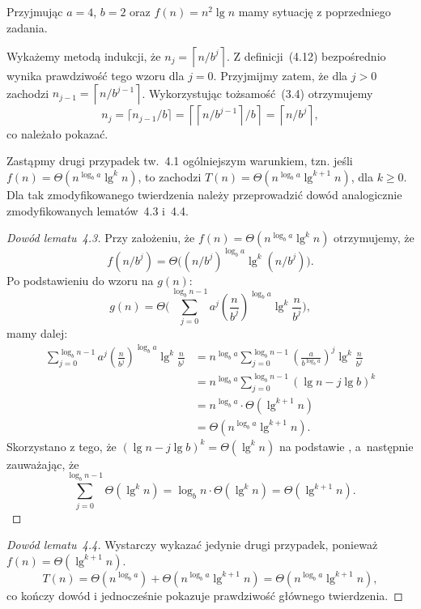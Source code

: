 \exercise %
Przyjmując $a=4$, $b=2$ oraz $f(n)=n^2\lg n$ mamy sytuację z poprzedniego zadania.


\exercise %
Wykażemy metodą indukcji, że $n_j=\left\lceil n/b^j\right\rceil$. Z definicji~(4.12) bezpośrednio wynika prawdziwość tego wzoru dla $j=0$. Przyjmijmy zatem, że dla $j>0$ zachodzi $n_{j-1}=\left\lceil n/b^{j-1}\right\rceil$. Wykorzystując tożsamość~(3.4) otrzymujemy
\[
	n_j = \lceil n_{j-1}/b\rceil = \left\lceil\left\lceil n/b^{j-1}\right\rceil\!/b\right\rceil = \left\lceil n/b^j\right\rceil,
\]
co należało pokazać.

\exercise %
Zastąpmy drugi przypadek tw.~4.1 ogólniejszym warunkiem, tzn. jeśli $f(n)=\Theta(n^{\log_ba}\lg^kn)$, to zachodzi $T(n)=\Theta(n^{\log_ba}\lg^{k+1}n)$, dla $k\ge0$. Dla tak zmodyfikowanego twierdzenia należy przeprowadzić dowód analogicznie zmodyfikowanych lematów~4.3 i~4.4.

\begin{proof}[Dowód lematu~4.3]
	Przy założeniu, że $f(n)=\Theta(n^{\log_ba}\lg^kn)$ otrzymujemy, że
	\[
		f(n/b^j)=\Theta\bigl((n/b^j)^{\log_ba}\lg^k(n/b^j)\bigr).
	\]
	Po podstawieniu do wzoru na $g(n)$:
	\[
		g(n) = \Theta\biggl(\sum_{j=0}^{\log_bn-1}a^j\left(\frac{n}{b^j}\right)^{\log_ba}\lg^k\frac{n}{b^j}\biggr),
	\]
	mamy dalej:
	\begin{align*}
		\sum_{j=0}^{\log_bn-1}a^j\left(\frac{n}{b^j}\right)^{\log_ba}\lg^k\frac{n}{b^j} &= n^{\log_ba}\sum_{j=0}^{\log_bn-1}\left(\frac{a}{b^{\log_ba}}\right)^j\lg^k\frac{n}{b^j} \\
		&= n^{\log_ba}\sum_{j=0}^{\log_bn-1}(\lg n-j\lg b)^k \\
		&= n^{\log_ba}\cdot\Theta(\lg^{k+1}n) \\
		&= \Theta(n^{\log_ba}\lg^{k+1}n).
	\end{align*}
	Skorzystano z tego, że $(\lg n-j\lg b)^k=\Theta(\lg^kn)$ na podstawie , a~następnie zauważając, że
	\[
		\sum_{j=0}^{\log_bn-1}\Theta(\lg^kn) = \log_bn\cdot\Theta(\lg^kn) = \Theta(\lg^{k+1}n).
	\]
\end{proof}

\begin{proof}[Dowód lematu~4.4]
	Wystarczy wykazać jedynie drugi przypadek, ponieważ $f(n)=\Theta(\lg^{k+1}n)$.
	\[
		T(n) = \Theta(n^{\log_ba})+\Theta(n^{\log_ba}\lg^{k+1}n) = \Theta(n^{\log_ba}\lg^{k+1}n),
	\]
	co kończy dowód i jednocześnie pokazuje prawdziwość głównego twierdzenia.
\end{proof}

